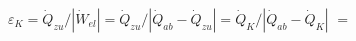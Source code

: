 \( \varepsilon_K = \dot{Q}_{zu} / |\dot{W}_{el}| = \dot{Q}_{zu} / |\dot{Q}_{ab} - \dot{Q}_{zu}| = \dot{Q}_{K} / |\dot{Q}_{ab} - \dot{Q}_{K}| \)  
\( = \)